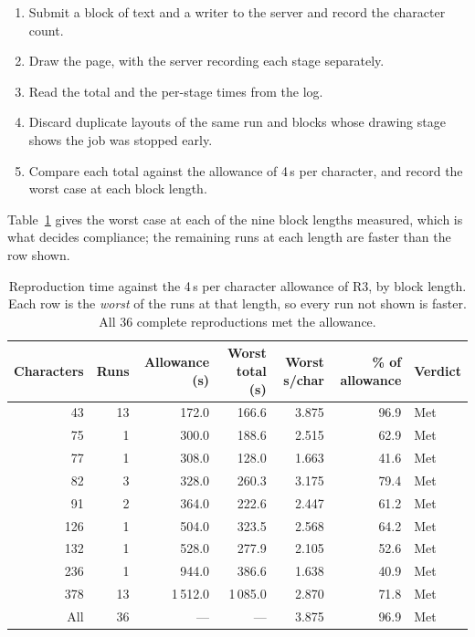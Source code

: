         \medskip

        \begin{enumerate}
        \item Submit a block of text and a writer to the server and record the
              character count.
        \item Draw the page, with the server recording each stage separately.
        \item Read the total and the per-stage times from the log.
        \item Discard duplicate layouts of the same run and blocks whose drawing
              stage shows the job was stopped early.
        \item Compare each total against the allowance of 4\,s per character,
              and record the worst case at each block length.
        \end{enumerate}

        \medskip

        Table~\ref{tab:res-r3} gives the worst case at each of the nine block
        lengths measured, which is what decides compliance; the remaining runs
        at each length are faster than the row shown.

\begin{table}[h]
\centering
\fontsize{10}{12}\selectfont
\begin{tabular}{|r|r|r|r|r|r|l|}
\hline
\textbf{Characters} & \textbf{Runs} & \textbf{Allowance (s)} & \textbf{Worst total (s)} & \textbf{Worst s/char} & \textbf{\% of allowance} & \textbf{Verdict} \\
\hline
 43 & 13 & 172.0  &  166.6 & 3.875 & 96.9 & Met \\
 75 &  1 & 300.0  &  188.6 & 2.515 & 62.9 & Met \\
 77 &  1 & 308.0  &  128.0 & 1.663 & 41.6 & Met \\
 82 &  3 & 328.0  &  260.3 & 3.175 & 79.4 & Met \\
 91 &  2 & 364.0  &  222.6 & 2.447 & 61.2 & Met \\
126 &  1 & 504.0  &  323.5 & 2.568 & 64.2 & Met \\
132 &  1 & 528.0  &  277.9 & 2.105 & 52.6 & Met \\
236 &  1 & 944.0  &  386.6 & 1.638 & 40.9 & Met \\
378 & 13 & 1\,512.0 & 1\,085.0 & 2.870 & 71.8 & Met \\
\hline
All & 36 & --- & --- & 3.875 & 96.9 & Met \\
\hline
\end{tabular}
\caption{Reproduction time against the 4\,s per character allowance of R3, by
block length. Each row is the \emph{worst} of the runs at that length, so every
run not shown is faster. All 36 complete reproductions met the allowance.}
\label{tab:res-r3}
\end{table}

